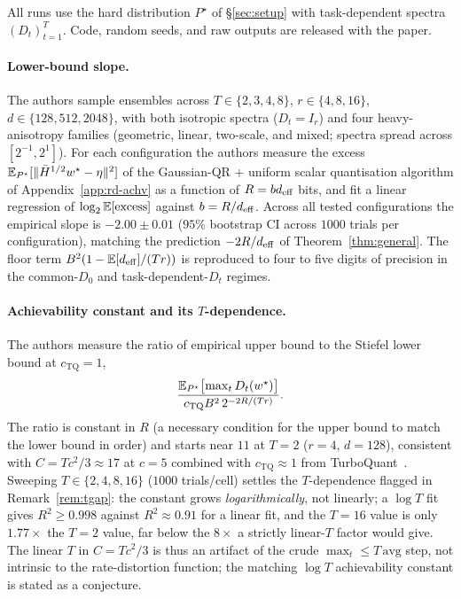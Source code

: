 All runs use the hard distribution $P^\star$ of \S\ref{sec:setup} with
task-dependent spectra $(D_t)_{t=1}^T$. Code, random seeds, and raw
outputs are released with the paper.

\paragraph{Lower-bound slope.} The authors sample ensembles across
$T\in\{2,3,4,8\}$, $r\in\{4,8,16\}$, $d\in\{128,512,2048\}$, with both
isotropic spectra ($D_t = I_r$) and four heavy-anisotropy families
(geometric, linear, two-scale, and mixed; spectra spread across
$[2^{-1}, 2^1]$). For each configuration the authors measure the excess
$\mathbb{E}_{P^\star}[\|\bar H^{1/2}w^\star - \eta\|^2]$ of the Gaussian-QR +
uniform scalar quantisation algorithm of Appendix~\ref{app:rd-achv} as a function
of $R = bd_{\mathrm{eff}}$ bits, and fit a linear regression of
$\log_2\mathbb{E}[\text{excess}]$ against $b = R/d_{\mathrm{eff}}$. Across all tested
configurations the empirical slope is $-2.00 \pm 0.01$ ($95\%$
bootstrap CI across $1000$ trials per configuration), matching the
prediction $-2R/d_{\mathrm{eff}}$ of Theorem~\ref{thm:general}. The floor term
$B^2(1 - \mathbb{E}[d_{\mathrm{eff}}]/(Tr))$ is reproduced to four to five digits of
precision in the common-$D_0$ and task-dependent-$D_t$ regimes.

\paragraph{Achievability constant and its $T$-dependence.} The authors measure
the ratio of empirical upper bound to the Stiefel lower bound at
$c_{\mathrm{TQ}} = 1$,
\begin{equation*}
  \frac{\mathbb{E}_{P^\star}\bigl[\max_t D_t(w^\star)\bigr]}
       {c_{\mathrm{TQ}} B^2\, 2^{-2R/(Tr)}}.
\end{equation*}
The ratio is constant in $R$ (a necessary
condition for the upper bound to match the lower bound in order) and
starts near $11$ at $T = 2$ ($r = 4$, $d = 128$), consistent with
$C = Tc^2/3 \approx 17$ at $c = 5$ combined with
$c_{\mathrm{TQ}} \approx 1$ from
TurboQuant~\citep{zandieh2025turboquant}. Sweeping
$T \in \{2, 4, 8, 16\}$ ($1000$ trials/cell) settles the $T$-dependence
flagged in Remark~\ref{rem:tgap}: the constant grows
\emph{logarithmically}, not linearly; a $\log T$ fit gives
$R^2 \geq 0.998$ against $R^2 \approx 0.91$ for a linear fit, and the
$T{=}16$ value is only $1.77\times$ the $T{=}2$ value, far below the
$8\times$ a strictly linear-$T$ factor would give. The linear $T$ in
$C = Tc^2/3$ is thus an artifact of the crude
$\max_t \leq T\,\mathrm{avg}$ step, not intrinsic to the
rate-distortion function; the matching $\log T$ achievability constant
is stated as a conjecture.

